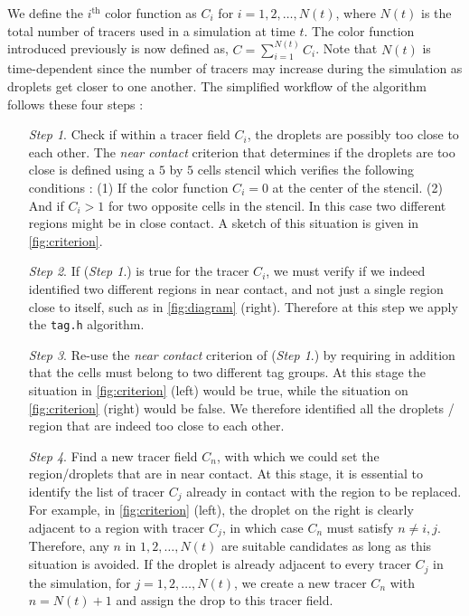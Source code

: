 We define the $i^\text{th}$ color function as $C_i$ for $i =1,2,\ldots,N(t)$, where $N(t)$ is the total number of tracers used in a simulation at time $t$.
The color function introduced previously is now defined as, $C = \sum_{i=1}^{N(t)} C_i$. 
Note that $N(t)$ is time-dependent since the number of tracers may increase during the simulation as droplets get closer to one another.
The simplified workflow of the algorithm follows these four steps : 
\begin{enumerate}
    \item[\textit{Step 1}.] Check if within a tracer field $C_i$, the droplets are possibly too close to each other. 
    The \textit{near contact} criterion that determines if the droplets are too close is defined using a $5$ by $5$ cells stencil which verifies the following conditions : 
    (1) If the color function $C_i = 0$ at the center of the stencil. 
    (2) And if $C_i > 1$ for two opposite cells in the stencil. 
    In this case two different regions might be in close contact.
    A sketch of this situation is given in \ref{fig:criterion}.  
    \item[\textit{Step 2}.] 
    If (\textit{Step 1}.) is true for the tracer $C_i$, we must verify if we indeed identified two different regions in near contact, and not just a single region close to itself, such as in \ref{fig:diagram} (right). 
    Therefore at this step  we apply the \texttt{tag.h} algorithm.
    \item[\textit{Step 3}.] Re-use the \textit{near contact} criterion of (\textit{Step 1}.) by requiring in addition that the cells must belong to two different tag groups. 
    At this stage the situation in \ref{fig:criterion} (left) would be true, while the situation on \ref{fig:criterion} (right) would be false. 
    We therefore identified all the droplets / region that are indeed too close to each other. 
    \item[\textit{Step 4}.] 
    Find a new tracer field $C_n$, with which we could set the region/droplets that are in near contact. 
    At this stage, it is essential to identify the list of tracer $C_j$ already in contact with the region to be replaced. 
    For example, in \ref{fig:criterion} (left), the droplet on the right is clearly adjacent to a region with tracer $C_j$, in which case $C_n$ must satisfy $n \neq i,j$. 
    Therefore, any $n$ in $1, 2, \ldots, N(t)$ are suitable candidates as long as this situation is avoided. 
    If the droplet is already adjacent to every tracer $C_j$ in the simulation, for $j = 1, 2, \ldots, N(t)$, we create a new tracer $C_n$ with $n = N(t)+1$ and assign the drop to this tracer field.
\end{enumerate}
